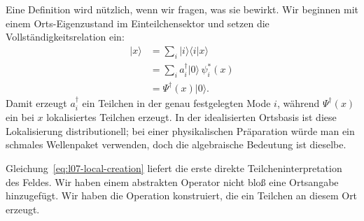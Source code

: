 Eine Definition wird nützlich, wenn wir fragen, was sie bewirkt. Wir beginnen mit einem Orts-Eigenzustand im Einteilchensektor und setzen die Vollständigkeitsrelation ein:
\begin{align}
|x\rangle
&=\sum_i |i\rangle\langle i|x\rangle \\
&=\sum_i a_i^\dagger|0\rangle\,\psi_i^*(x) \\
&=\Psi^\dagger(x)|0\rangle.
\label{eq:l07-local-creation}
\end{align}
Damit erzeugt \(a_i^\dagger\) ein Teilchen in der genau festgelegten Mode \(i\), während \(\Psi^\dagger(x)\) ein bei \(x\) lokalisiertes Teilchen erzeugt. In der idealisierten Ortsbasis ist diese Lokalisierung distributionell; bei einer physikalischen Präparation würde man ein schmales Wellenpaket verwenden, doch die algebraische Bedeutung ist dieselbe.

\begin{classroomqa}
\end{classroomqa}

Gleichung~\eqref{eq:l07-local-creation} liefert die erste direkte Teilcheninterpretation des Feldes. Wir haben einem abstrakten Operator nicht bloß eine Ortsangabe hinzugefügt. Wir haben die Operation konstruiert, die ein Teilchen an diesem Ort erzeugt.

\begin{classroomqa}
\end{classroomqa}

\begin{classroomqa}
\end{classroomqa}

